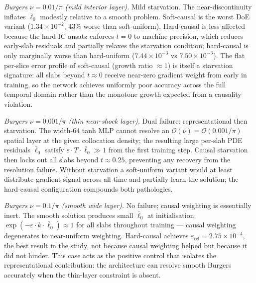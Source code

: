 \documentclass{article}
\newcommand{\relL}{\varepsilon_{\mathrm{rel}}}
\begin{document}
\emph{Burgers $\nu=0.01/\pi$ (mild interior layer).} Mild starvation. The
near-discontinuity inflates $\bar{\ell}_0$ modestly relative to a smooth problem.
Soft-causal is the worst DoE variant ($1.34\times10^{-2}$, $43\%$ worse than
soft-uniform). Hard-causal is less affected because the hard IC ansatz enforces
$t=0$ to machine precision, which reduces early-slab residuals and partially
relaxes the starvation condition; hard-causal is only marginally worse than
hard-uniform ($7.44\times10^{-3}$ vs $7.50\times10^{-3}$).
The flat per-slice error profile of soft-causal (growth ratio $\approx1$) is
itself a starvation signature: all slabs beyond $t\approx0$ receive near-zero
gradient weight from early in training, so the network achieves uniformly poor
accuracy across the full temporal domain rather than the monotone growth expected
from a causality violation.

\emph{Burgers $\nu=0.001/\pi$ (thin near-shock layer).} Dual failure: representational
then starvation.
The width-64 tanh MLP cannot resolve an $\mathcal{O}(\nu)=\mathcal{O}(0.001/\pi)$
spatial layer at the given collocation density; the resulting large per-slab
PDE residuals $\bar{\ell}_0$ satisfy $\varepsilon\cdot T\cdot\bar{\ell}_0\gg1$
from the first training step.
Causal starvation then locks out all slabs beyond $t\approx0.25$, preventing
any recovery from the resolution failure.
Without starvation a soft-uniform variant would at least distribute gradient
signal across all time and partially learn the solution; the hard-causal
configuration compounds both pathologies.

\emph{Burgers $\nu=0.1/\pi$ (smooth wide layer).} No failure; causal weighting
is essentially inert.
The smooth solution produces small $\bar{\ell}_0$ at initialisation;
$\exp(-\varepsilon\cdot k\cdot\bar{\ell}_0)\approx1$ for all slabs throughout
training — causal weighting degenerates to near-uniform weighting.
Hard-causal achieves $\relL=2.75\times10^{-4}$, the best result in the study,
not because causal weighting helped but because it did not hinder.
This case acts as the positive control that isolates the representational
contribution: the architecture can resolve smooth Burgers accurately when the
thin-layer constraint is absent.
\end{document}
